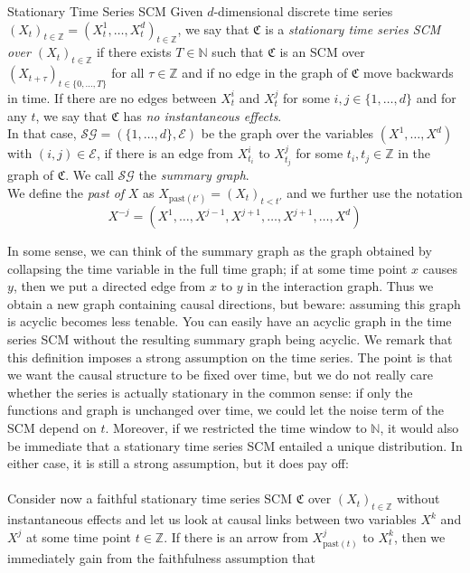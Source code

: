 \documentclass[11pt, a4paper]{memoir}
\theoremstyle{break}
\theoremstyle{break}
\theoremstyle{nonumberplain}
\newcommand{\mN}{\mathbb{N}}
\newcommand{\mZ}{\mathbb{Z}}
\begin{document}
\begin{mydefinition}{Stationary Time Series SCM}
Given $d$-dimensional discrete time series $(X_t)_{t\in \mZ}=(X_t^1,\ldots,X_t^d)_{t\in \mZ}$, we say that $\mathfrak{C}$ is a \emph{stationary time series SCM over $(X_t)_{t\in \mZ}$} if there exists $T\in \mN$ such that $\mathfrak{C}$ is an SCM over $(X_{t+\tau})_{t\in \{0,\ldots,T\}}$ for all $\tau\in \mZ$ and if no edge in the graph of $\mathfrak{C}$ move backwards in time. If there are no edges between $X^i_t$ and $X^j_t$ for some $i,j\in \{1,\ldots,d\}$ and for any $t$, we say that $\mathfrak{C}$ has \emph{no instantaneous effects}.\\[5pt]
In that case, $\mathcal{SG}=(\{1,\ldots,d\},\mathcal{E})$ be the graph over the variables $(X^1,\ldots,X^d)$ with $(i,j)\in \mathcal{E}$, if there is an edge from $X_{t_i}^i$ to $X_{t_j}^j$ for some $t_i,t_j\in \mZ$ in the graph of $\mathfrak{C}$. We call $\mathcal{SG}$ the \emph{summary graph}.\\[5pt]
We define the \emph{past of} $X$ as $X_{\text{past}(t')}=(X_t)_{t<t'}$ and we further use the notation $$X^{-j}=(X^1,\ldots,X^{j-1},X^{j+1},\ldots, X^{j+1},\ldots,X^d)$$
\end{mydefinition}
\noindent In some sense, we can think of the summary graph as the graph obtained by collapsing the time variable in the full time graph; if at some time point $x$ causes $y$, then we put a directed edge from $x$ to $y$ in the interaction graph. Thus we obtain a new graph containing causal directions, but beware: assuming this graph is acyclic becomes less tenable. You can easily have an acyclic graph in the time series SCM without the resulting summary graph being acyclic. We remark that this definition imposes a strong assumption on the time series. The point is that we want the causal structure to be fixed over time, but we do not really care whether the series is actually stationary in the common sense: if only the functions and graph is unchanged over time, we could let the noise term of the SCM depend on $t$. Moreover, if we restricted the time window to $\mN$, it would also be immediate that a stationary time series SCM entailed a unique distribution.  In either case, it is still a strong assumption, but it does pay off:\\\\
Consider now a faithful stationary time series SCM $\mathfrak{C}$ over $(X_t)_{t\in \mZ}$ without instantaneous effects and let us look at causal links between two variables $X^k$ and $X^j$ at some time point $t\in \mZ$. If there is an arrow from $X_{\text{past}(t)}^j$ to $X_t^k$, then we immediately gain from the faithfulness assumption that
\end{document}
